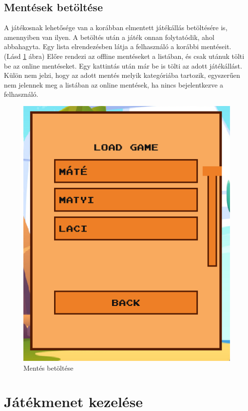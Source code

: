 \subsection{Mentések betöltése}
 A játékosnak lehetősége van a korábban elmentett játékállás betöltésére is, amennyiben van ilyen. A betöltés után a játék onnan folytatódik, ahol abbahagyta. Egy lista elrendezésben látja a felhasználó a korábbi mentéseit. (Lásd \ref{fig:Mentés betöltés} ábra) Előre rendezi az offline mentéseket a listában, és csak utánuk tölti be az online mentéseket. Egy kattintás után már be is tölti az adott játékállást. Külön nem jelzi, hogy az adott mentés melyik kategóriába tartozik, egyszerűen nem jelennek meg a listában az online mentések, ha nincs bejelentkezve a felhasználó.

 \begin{figure}[H]
    \centering
    \includegraphics[width=8.0truecm]{images/loadgame.png}
    \caption{Mentés betöltése}
    \label{fig:Mentés betöltés}
\end{figure}

\section{Játékmenet kezelése}

